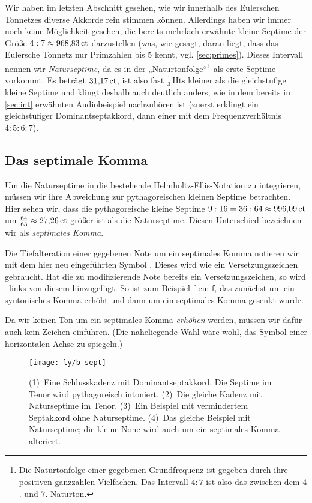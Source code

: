 Wir haben im letzten Abschnitt gesehen, wie wir innerhalb des Eulerschen
Tonnetzes diverse Akkorde rein stimmen können.  Allerdings haben wir immer noch
keine Möglichkeit gesehen, die bereits mehrfach erwähnte kleine Septime der
Größe $4:7\approx 968{,}83\,\mathrm{ct}$ darzustellen (was, wie gesagt, daran liegt,
dass das Eulersche Tonnetz nur Primzahlen bis $5$ kennt,
vgl. \cref{sec:primes}). Dieses Intervall nennen wir \emph{Naturseptime}, da es
in der „Naturtonfolge“\footnote{Die Naturtonfolge einer gegebenen Grundfrequenz
  ist gegeben durch ihre positiven ganzzahlen Vielfachen. Das Intervall $4:7$
  ist also das zwischen dem $4$. und $7$. Naturton.} als erste Septime vorkommt.
Es beträgt $31{,}17\,\mathrm{ct}$, ist also fast $\frac13\,\text{Hts}$ kleiner als
die gleichstufige kleine Septime und klingt deshalb auch deutlich anders, wie in
dem bereits in \cref{sec:int} erwähnten Audiobeispiel nachzuhören ist
(zuerst erklingt ein gleichstufiger Dominantseptakkord, dann einer mit dem
Frequenzverhältnis $4:5:6:7$).

\subsection{Das septimale Komma}

Um die Naturseptime in die bestehende Helmholtz-Ellis-Notation zu integrieren,
müssen wir ihre Abweichung zur pythagoreischen kleinen Septime betrachten.  Hier
sehen wir, dass die pythagoreische kleine Septime
$9:16=36:64\approx 996{,}09\,\mathrm{ct}$ um $\frac{64}{63}\approx 27{,}26\,\mathrm{ct}$
größer ist als die Naturseptime. Diesen Unterschied bezeichnen wir als
\emph{septimales Komma}.

Die Tiefalteration einer gegebenen Note um ein septimales Komma notieren wir mit
dem hier neu eingeführten Symbol \septimal.  Dieses wird wie ein
Versetzungszeichen gebraucht. Hat die zu modifizierende Note bereits ein
Versetzungszeichen, so wird \septimal\ links von diesem hinzugefügt. So ist zum
Beispiel \septimal\naturalp f ein f, das zunächst um ein syntonisches Komma
erhöht und dann um ein septimales Komma gesenkt wurde.

Da wir keinen Ton um ein septimales Komma \emph{erhöhen} werden, müssen wir dafür
auch kein Zeichen einführen. (Die naheliegende Wahl wäre wohl, das Symbol einer
horizontalen Achse zu spiegeln.)

\begin{figure}
	\centering
	\texttt{[image: ly/b-sept]}
	\caption{(1)~Eine Schlusskadenz mit Dominantseptakkord. Die Septime im
		Tenor wird pythagoreisch intoniert.
		\quad(2)~Die gleiche Kadenz mit Naturseptime im Tenor.
		\quad(3)~Ein Beispiel mit vermindertem Septakkord ohne Naturseptime.
		\quad(4)~Das gleiche Beispiel mit Naturseptime; die kleine None wird
		auch um ein septimales Komma alteriert.}\label{fig:sept}
\end{figure}

